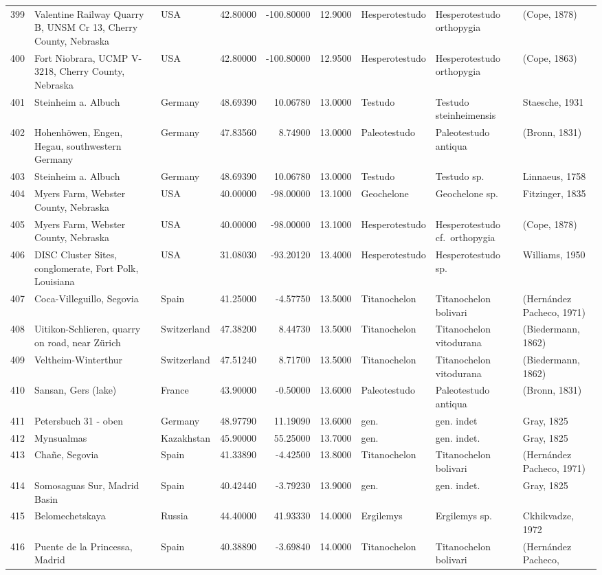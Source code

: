 \documentclass[]{article}
\begin{document}
\begin{longtable}[]{@{}lllrrrlll@{}}
399 & Valentine Railway Quarry B, UNSM Cr 13, Cherry County, Nebraska &
USA & 42.80000 & -100.80000 & 12.9000 & Hesperotestudo & Hesperotestudo
orthopygia & (Cope, 1878)\tabularnewline
400 & Fort Niobrara, UCMP V-3218, Cherry County, Nebraska & USA &
42.80000 & -100.80000 & 12.9500 & Hesperotestudo & Hesperotestudo
orthopygia & (Cope, 1863)\tabularnewline
401 & Steinheim a. Albuch & Germany & 48.69390 & 10.06780 & 13.0000 &
Testudo & Testudo steinheimensis & Staesche, 1931\tabularnewline
402 & Hohenhöwen, Engen, Hegau, southwestern Germany & Germany &
47.83560 & 8.74900 & 13.0000 & Paleotestudo & Paleotestudo antiqua &
(Bronn, 1831)\tabularnewline
403 & Steinheim a. Albuch & Germany & 48.69390 & 10.06780 & 13.0000 &
Testudo & Testudo sp. & Linnaeus, 1758\tabularnewline
404 & Myers Farm, Webster County, Nebraska & USA & 40.00000 & -98.00000
& 13.1000 & Geochelone & Geochelone sp. & Fitzinger, 1835\tabularnewline
405 & Myers Farm, Webster County, Nebraska & USA & 40.00000 & -98.00000
& 13.1000 & Hesperotestudo & Hesperotestudo cf.~orthopygia & (Cope,
1878)\tabularnewline
406 & DISC Cluster Sites, conglomerate, Fort Polk, Louisiana & USA &
31.08030 & -93.20120 & 13.4000 & Hesperotestudo & Hesperotestudo sp. &
Williams, 1950\tabularnewline
407 & Coca-Villeguillo, Segovia & Spain & 41.25000 & -4.57750 & 13.5000
& Titanochelon & Titanochelon bolivari & (Hernández Pacheco,
1971)\tabularnewline
408 & Uitikon-Schlieren, quarry on road, near Zürich & Switzerland &
47.38200 & 8.44730 & 13.5000 & Titanochelon & Titanochelon vitodurana &
(Biedermann, 1862)\tabularnewline
409 & Veltheim-Winterthur & Switzerland & 47.51240 & 8.71700 & 13.5000 &
Titanochelon & Titanochelon vitodurana & (Biedermann,
1862)\tabularnewline
410 & Sansan, Gers (lake) & France & 43.90000 & -0.50000 & 13.6000 &
Paleotestudo & Paleotestudo antiqua & (Bronn, 1831)\tabularnewline
411 & Petersbuch 31 - oben & Germany & 48.97790 & 11.19090 & 13.6000 &
gen. & gen. indet & Gray, 1825\tabularnewline
412 & Mynsualmas & Kazakhstan & 45.90000 & 55.25000 & 13.7000 & gen. &
gen. indet. & Gray, 1825\tabularnewline
413 & Chañe, Segovia & Spain & 41.33890 & -4.42500 & 13.8000 &
Titanochelon & Titanochelon bolivari & (Hernández Pacheco,
1971)\tabularnewline
414 & Somosaguas Sur, Madrid Basin & Spain & 40.42440 & -3.79230 &
13.9000 & gen. & gen. indet. & Gray, 1825\tabularnewline
415 & Belomechetskaya & Russia & 44.40000 & 41.93330 & 14.0000 &
Ergilemys & Ergilemys sp. & Ckhikvadze, 1972\tabularnewline
416 & Puente de la Princessa, Madrid & Spain & 40.38890 & -3.69840 &
14.0000 & Titanochelon & Titanochelon bolivari & (Hernández Pacheco,

\end{longtable}
\end{document}
